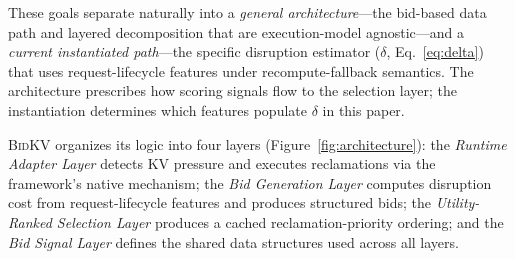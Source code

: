 \documentclass[conference]{IEEEtran}
\newcommand{\bidkv}{\textsc{BidKV}\xspace}
\newcommand{\tokfree}{\ensuremath{r}}
\newcommand{\qualdelta}{\ensuremath{\delta}}
\begin{document}
These goals separate naturally into a \emph{general architecture}---the
bid-based data path and layered decomposition that are execution-model
agnostic---and a \emph{current instantiated path}---the specific disruption
estimator ($\qualdelta$, Eq.~\ref{eq:delta}) that uses request-lifecycle
features under recompute-fallback semantics.  The architecture prescribes how
scoring signals flow to the selection layer; the instantiation determines which features
populate $\qualdelta$ in this paper.

\bidkv organizes its logic into four layers (Figure~\ref{fig:architecture}): the
\emph{Runtime Adapter Layer} detects KV pressure and executes reclamations via
the framework's native mechanism; the \emph{Bid Generation Layer} computes
disruption cost from request-lifecycle features and produces structured bids;
the \emph{Utility-Ranked Selection Layer}
produces a cached reclamation-priority ordering; and the \emph{Bid Signal Layer}
defines the shared data structures used across all layers.





\end{document}
